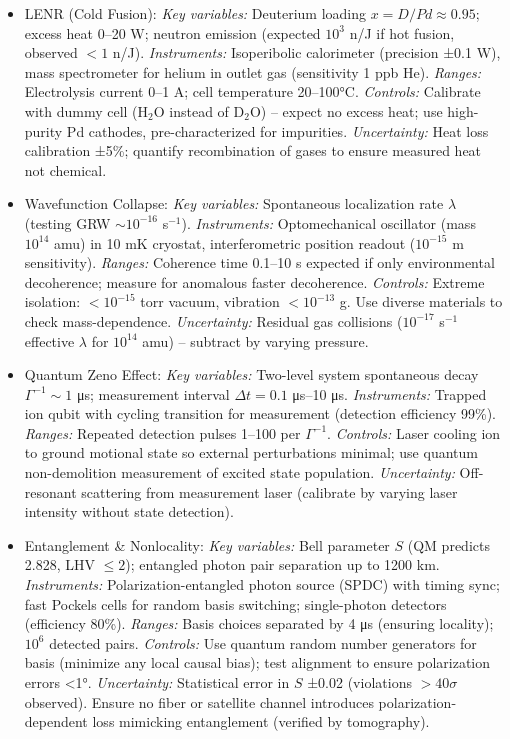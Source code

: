 \documentclass[11pt]{article}
\begin{document}
\begin{itemize}
\item 
LENR (Cold Fusion): \textit{Key variables:} Deuterium loading $x = D/Pd \approx 0.95$; excess heat 0–20 W; neutron emission (expected $10^3$ n/J if hot fusion, observed $<1$ n/J). \textit{Instruments:} Isoperibolic calorimeter (precision ±0.1 W), mass spectrometer for helium in outlet gas (sensitivity 1 ppb He). \textit{Ranges:} Electrolysis current 0–1 A; cell temperature 20–100°C. \textit{Controls:} Calibrate with dummy cell (H$_2$O instead of D$_2$O) – expect no excess heat; use high-purity Pd cathodes, pre-characterized for impurities. \textit{Uncertainty:} Heat loss calibration ±5\%; quantify recombination of gases to ensure measured heat not chemical.




\item 
Wavefunction Collapse: \textit{Key variables:} Spontaneous localization rate $\lambda$ (testing GRW $\sim10^{-16}$ s$^{-1}$). \textit{Instruments:} Optomechanical oscillator (mass $10^{14}$ amu) in 10 mK cryostat, interferometric position readout ($10^{-15}$ m sensitivity). \textit{Ranges:} Coherence time 0.1–10 s expected if only environmental decoherence; measure for anomalous faster decoherence. \textit{Controls:} Extreme isolation: $<10^{-15}$ torr vacuum, vibration $<10^{-13}$ g. Use diverse materials to check mass-dependence. \textit{Uncertainty:} Residual gas collisions ($10^{-17}$ s$^{-1}$ effective $\lambda$ for $10^{14}$ amu) – subtract by varying pressure.




\item 
Quantum Zeno Effect: \textit{Key variables:} Two-level system spontaneous decay $\Gamma^{-1}\sim1$ μs; measurement interval $\Delta t = 0.1$ μs–10 μs. \textit{Instruments:} Trapped ion qubit with cycling transition for measurement (detection efficiency 99\%). \textit{Ranges:} Repeated detection pulses 1–100 per $\Gamma^{-1}$. \textit{Controls:} Laser cooling ion to ground motional state so external perturbations minimal; use quantum non-demolition measurement of excited state population. \textit{Uncertainty:} Off-resonant scattering from measurement laser (calibrate by varying laser intensity without state detection).




\item 
Entanglement & Nonlocality: \textit{Key variables:} Bell parameter $S$ (QM predicts 2.828, LHV $\le2$); entangled photon pair separation up to 1200 km. \textit{Instruments:} Polarization-entangled photon source (SPDC) with timing sync; fast Pockels cells for random basis switching; single-photon detectors (efficiency 80\%). \textit{Ranges:} Basis choices separated by 4 μs (ensuring locality); $10^6$ detected pairs. \textit{Controls:} Use quantum random number generators for basis (minimize any local causal bias); test alignment to ensure polarization errors <1°. \textit{Uncertainty:} Statistical error in $S$ ±0.02 (violations $>40\sigma$ observed). Ensure no fiber or satellite channel introduces polarization-dependent loss mimicking entanglement (verified by tomography).




\end{itemize}
\end{document}
